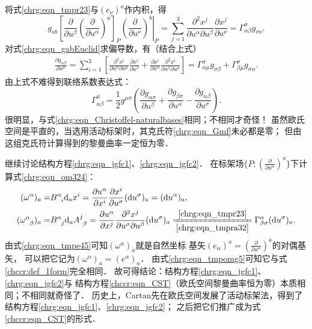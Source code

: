 将式\eqref{chrg:eqn_tmpr23}与$(e_\nu)^a$作内积，得
\begin{equation}
    g_{ab} \left[\frac{\partial }{\partial u^\beta} \left(\frac{\partial}{\partial u^\alpha}\right)^a\right]_P
    \left. \left(\frac{\partial}{\partial u^\nu}\right)^b\right|_{P}
    = \sum_{j=1}^{3}\frac{\partial^2 x^j}{\partial u^\alpha\partial u^\beta}
    \frac{\partial x^j}{\partial u^\nu}
    = \Gamma^\sigma_{\alpha\beta} g_{\sigma\nu}  .
\end{equation}
对式\eqref{chrg:eqn_gabEuclid}求偏导数，有（结合上式）
\begin{align}
    \frac{\partial g_{\alpha\beta}}{\partial u^\mu} = 
    \sum_{i=1}^{3}\left[\frac{\partial^2 x^i}{\partial u^\alpha\partial u^\mu}
    \frac{\partial x^i}{\partial u^\beta}+ \frac{\partial x^i}{\partial u^\alpha}
    \frac{\partial^2 x^i}{\partial u^\beta\partial u^\mu}   \right] 
    = \Gamma^\sigma_{\alpha\mu} g_{\sigma\beta} + \Gamma^\sigma_{\beta\mu} g_{\sigma\alpha} .
\end{align}
由上式不难得到联络系数表达式：
\begin{equation}\label{chrg:eqn_Gmf}
    \Gamma^\mu_{\alpha\beta}= \frac{1}{2} g^{\mu\sigma}\left(
    \frac{\partial g_{\alpha\sigma}}{\partial u^\beta}+
    \frac{\partial g_{\beta\sigma}}{\partial u^\alpha}-
    \frac{\partial g_{\alpha\beta}}{\partial u^\sigma}\right) .
\end{equation}
很明显，与式\eqref{chrg:eqn_Christoffel-naturalbases}相同；不相同才奇怪！
虽然欧氏空间是平直的，当选用活动标架时，其克氏符\eqref{chrg:eqn_Gmf}未必都是零；
但由这组克氏符计算得到的黎曼曲率一定恒为零．



继续讨论结构方程\eqref{chrg:eqn_jgfc1}、\eqref{chrg:eqn_jgfc2}．
在标架场$\{P;(\frac{\partial}{\partial u^\alpha})^a\}$下计算式\eqref{chrg:eqn_om324}：
\begin{align}
    (\omega^\alpha)_a =& B^{\alpha}_{\hphantom{\alpha} i} {\rm d}_a x^i=\frac{\partial u^\alpha}{\partial x^i}
    \frac{\partial x^i}{\partial u^\sigma}({\rm d}u^\sigma)_a=({\rm d}u^\alpha)_a, \label{chrg:eqn_tmpe45} \\
    (\omega^{\alpha}_{\hphantom{\alpha} \beta})_a=&B^{\alpha}_{\hphantom{\alpha} j}{\rm d}_a A^j_{\hphantom{j} \beta}
    =\frac{\partial u^\alpha}{\partial x^j} \frac{\partial^2 x^j}
    {\partial u^\sigma\partial u^\beta}({\rm d}u^\sigma)_a
    \xlongequal[\ref{chrg:eqn_tmpra32}]{\ref{chrg:eqn_tmpr23}}
    \Gamma^\alpha_{\beta \sigma}({\rm d}u^\sigma)_a. \label{chrg:eqn_tmpomg5}
\end{align}
由式\eqref{chrg:eqn_tmpe45}可知$(\omega^\alpha)_a$就是自然坐标
基矢$(e_\alpha)^a=(\frac{\partial}{\partial u^\alpha})^a$的对偶基矢，
可以把它记为$(\omega^\alpha)_a=(e^\alpha)_a$．
由式\eqref{chrg:eqn_tmpomg5}可知它与式\eqref{chccr:def_1form}完全相同．
故可得结论：结构方程\eqref{chrg:eqn_jgfc1}、\eqref{chrg:eqn_jgfc2}与
结构方程\eqref{chccr:eqn_CST}（欧氏空间黎曼曲率恒为零）本质相同；不相同就奇怪了．
历史上，Cartan先在欧氏空间发展了活动标架法，得到了结构方程\eqref{chrg:eqn_jgfc1}、\eqref{chrg:eqn_jgfc2}；
之后把它们推广成为式\eqref{chccr:eqn_CST}的形式．


